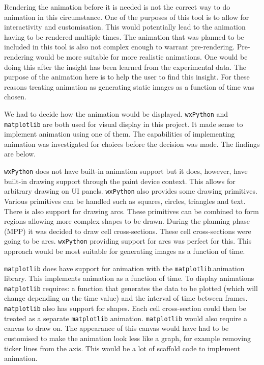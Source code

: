 Rendering the animation before it is needed is not the correct way to do animation in this circumstance.  One of the purposes of this tool is to allow for interactivity and customisation.  This would potentially lead to the animation having to be rendered multiple times.  The animation that was planned to be included in this tool is also not complex enough to warrant pre-rendering.  Pre-rendering would be more suitable for more realistic animations.  One would be doing this after the insight has been learned from the experimental data.  The purpose of the animation here is to help the user to find this insight.  For these reasons treating animation as generating static images as a function of time was chosen.

We had to decide how the animation would be displayed.  \texttt{wxPython} and \texttt{matplotlib} are both used for visual display in this project.  It made sense to implement animation using one of them.  The capabilities of implementing animation was investigated for choices before the decision was made.  The findings are below.

\texttt{wxPython} does not have built-in animation support but it does, however, have built-in drawing support through the paint device context.  This allows for arbitrary drawing on \ac{UI} panels.  \texttt{wxPython} also provides some drawing primitives.  Various primitives can be handled such as squares, circles, triangles and text.  There is also support for drawing arcs.  These primitives can be combined to form regions allowing more complex shapes to be drawn.  During the planning phase (MPP) it was decided to draw cell cross-sections.  These cell cross-sections were going to be arcs.  \texttt{wxPython} providing support for arcs was perfect for this.  This approach would be most suitable for generating images as a function of time.

\texttt{matplotlib} does have support for animation with the \texttt{matplotlib}.animation library.  This implements animation as a function of time.  To display animations \texttt{matplotlib} requires: a function that generates the data to be plotted (which will change depending on the time value) and the interval of time between frames.  \texttt{matplotlib} also has support for shapes.  Each cell cross-section could then be treated as a separate \texttt{matplotlib} animation.  \texttt{matplotlib} would also require a canvas to draw on.  The appearance of this canvas would have had to be customised to make the animation look less like a graph, for example removing ticker lines from the axis.  This would be a lot of scaffold code to implement animation.

